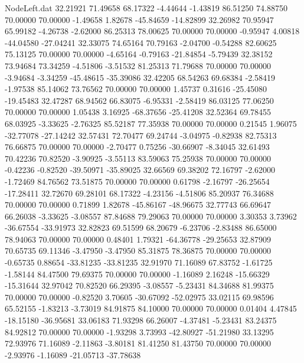 \begin{filecontents}{NodeLeft.dat}
  32.21921   71.49658   68.17322    -4.44644   -1.43819   86.51250   74.88750   70.00000   70.00000   -1.49658    1.82678  -45.84659  -14.82899
  32.26982   70.95947   65.99182    -4.26738   -2.62000   86.25313   78.00625   70.00000   70.00000   -0.95947    4.00818  -44.04580  -27.04241
  32.33075   74.65164   70.79163    -2.04700   -0.54288   82.60625   75.13125   70.00000   70.00000   -4.65164   -0.79163  -21.84854   -5.79439
  32.38152   73.94684   73.34259    -4.51806   -3.51532   81.25313   71.79688   70.00000   70.00000   -3.94684   -3.34259  -45.48615  -35.39086
  32.42205   68.54263   69.68384    -2.58419   -1.97538   85.14062   73.76562   70.00000   70.00000    1.45737    0.31616  -25.45080  -19.45483
  32.47287   68.94562   66.83075    -6.95331   -2.58419   86.03125   77.06250   70.00000   70.00000    1.05438    3.16925  -68.37656  -25.41208
  32.52364   69.78455   68.03925    -3.33625   -2.76325   85.52187   77.35938   70.00000   70.00000    0.21545    1.96075  -32.77078  -27.14242
  32.57431   72.70477   69.24744    -3.04975   -0.82938   82.75313   76.66875   70.00000   70.00000   -2.70477    0.75256  -30.66907   -8.34045
  32.61493   70.42236   70.82520    -3.90925   -3.55113   83.59063   75.25938   70.00000   70.00000   -0.42236   -0.82520  -39.50971  -35.89025
  32.66569   69.38202   72.16797    -2.62000   -1.72469   84.76562   73.51875   70.00000   70.00000    0.61798   -2.16797  -26.25654  -17.28411
  32.72670   69.28101   68.17322    -4.23156   -4.51806   85.20937   76.34688   70.00000   70.00000    0.71899    1.82678  -45.86167  -48.96675
  32.77743   66.69647   66.26038    -3.33625   -3.08557   87.84688   79.29063   70.00000   70.00000    3.30353    3.73962  -36.67554  -33.91973
  32.82823   69.51599   68.20679    -6.23706   -2.83488   86.65000   78.94063   70.00000   70.00000    0.48401    1.79321  -64.36778  -29.25653
  32.87909   70.65735   69.11346    -3.47950   -3.47950   85.31875   78.36875   70.00000   70.00000   -0.65735    0.88654  -33.81235  -33.81235
  32.91970   71.16089   67.83752    -1.61725   -1.58144   84.47500   79.69375   70.00000   70.00000   -1.16089    2.16248  -15.66329  -15.31644
  32.97042   70.82520   66.29395    -3.08557   -5.23431   84.34688   81.99375   70.00000   70.00000   -0.82520    3.70605  -30.67092  -52.02975
  33.02115   69.98596   65.52155    -1.83213   -3.73019   84.91875   84.10000   70.00000   70.00000    0.01404    4.47845  -18.15180  -36.95681
  33.06183   71.93298   66.26007    -4.37481   -5.23431   83.24375   84.92812   70.00000   70.00000   -1.93298    3.73993  -42.80927  -51.21980
  33.13295   72.93976   71.16089    -2.11863   -3.80181   81.41250   81.43750   70.00000   70.00000   -2.93976   -1.16089  -21.05713  -37.78638

\end{filecontents}
